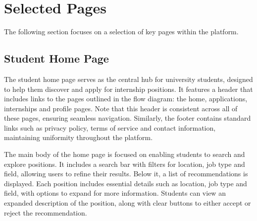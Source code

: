 \section{Selected Pages}
The following section focuses on a selection of key pages within the platform.

\newpage
\subsection{Student Home Page}
The student home page serves as the central hub for university students, designed to help them discover and apply for internship positions.
It features a header that includes links to the pages outlined in the flow diagram: the home, applications, internships and profile pages.
Note that this header is consistent across all of these pages, ensuring seamless navigation.
Similarly, the footer contains standard links such as privacy policy, terms of service and contact information, maintaining uniformity throughout the platform.

The main body of the home page is focused on enabling students to search and explore positions.
It includes a search bar with filters for location, job type and field, allowing users to refine their results.
Below it, a list of recommendations is displayed.
Each position includes essential details such as location, job type and field, with options to expand for more information.
Students can view an expanded description of the position, along with clear buttons to either accept or reject the recommendation.


